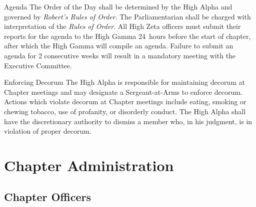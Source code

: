 \documentclass{article}
\begin{document}
\begin{subsubsectionList}
  \item {\titleStyle Agenda\titleSuffix}
  The Order of the Day shall be determined by the High Alpha and governed by
  \emph{Robert’s Rules of Order}. The Parliamentarian shall be charged with
  interpretation of the \emph{Rules of Order}. All High Zeta officers must
  submit their reports for the agenda to the High Gamma 24~hours before the
  start of chapter, after which the High Gamma will compile an agenda. Failure
  to submit an agenda for 2 consecutive weeks will result in a mandatory meeting
  with the Executive Committee.

  \item {\titleStyle Enforcing Decorum\titleSuffix}
  The High Alpha is responsible for maintaining decorum at Chapter meetings and
  may designate a Sergeant-at-Arms to enforce decorum. Actions which violate
  decorum at Chapter meetings include eating, smoking or chewing tobacco, use of
  profanity, or disorderly conduct. The High Alpha shall have the discretionary
  authority to dismiss a member who, in his judgment, is in violation of proper
  decorum.
\end{subsubsectionList}

\section{Chapter Administration}

\subsection{Chapter Officers}
\end{document}
